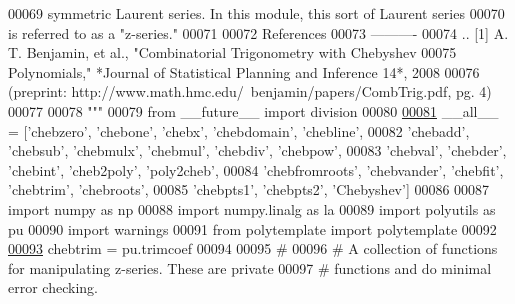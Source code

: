 \begin{DoxyCode}
00069 \textcolor{stringliteral}{symmetric Laurent series.  In this module, this sort of Laurent series}
00070 \textcolor{stringliteral}{is referred to as a "z-series."}
00071 \textcolor{stringliteral}{}
00072 \textcolor{stringliteral}{References}
00073 \textcolor{stringliteral}{----------}
00074 \textcolor{stringliteral}{.. [1] A. T. Benjamin, et al., "Combinatorial Trigonometry with Chebyshev}
00075 \textcolor{stringliteral}{  Polynomials," *Journal of Statistical Planning and Inference 14*, 2008}
00076 \textcolor{stringliteral}{  (preprint: http://www.math.hmc.edu/~benjamin/papers/CombTrig.pdf, pg. 4)}
00077 \textcolor{stringliteral}{}
00078 \textcolor{stringliteral}{"""}
00079 \textcolor{keyword}{from} \_\_future\_\_ \textcolor{keyword}{import} division
00080 
\hypertarget{chebyshev_8py_source_l00081}{}\hyperlink{namespacepyneb_1_1utils_1_1chebyshev_a9cb4e1ba55fc61d6dd46d5c6f534edbc}{00081} \_\_all\_\_ = [\textcolor{stringliteral}{'chebzero'}, \textcolor{stringliteral}{'chebone'}, \textcolor{stringliteral}{'chebx'}, \textcolor{stringliteral}{'chebdomain'}, \textcolor{stringliteral}{'chebline'},
00082         \textcolor{stringliteral}{'chebadd'}, \textcolor{stringliteral}{'chebsub'}, \textcolor{stringliteral}{'chebmulx'}, \textcolor{stringliteral}{'chebmul'}, \textcolor{stringliteral}{'chebdiv'}, \textcolor{stringliteral}{'chebpow'},
00083         \textcolor{stringliteral}{'chebval'}, \textcolor{stringliteral}{'chebder'}, \textcolor{stringliteral}{'chebint'}, \textcolor{stringliteral}{'cheb2poly'}, \textcolor{stringliteral}{'poly2cheb'},
00084         \textcolor{stringliteral}{'chebfromroots'}, \textcolor{stringliteral}{'chebvander'}, \textcolor{stringliteral}{'chebfit'}, \textcolor{stringliteral}{'chebtrim'}, \textcolor{stringliteral}{'chebroots'},
00085         \textcolor{stringliteral}{'chebpts1'}, \textcolor{stringliteral}{'chebpts2'}, \textcolor{stringliteral}{'Chebyshev'}]
00086 
00087 \textcolor{keyword}{import} numpy \textcolor{keyword}{as} np
00088 \textcolor{keyword}{import} numpy.linalg \textcolor{keyword}{as} la
00089 \textcolor{keyword}{import} polyutils \textcolor{keyword}{as} pu
00090 \textcolor{keyword}{import} warnings
00091 \textcolor{keyword}{from} polytemplate \textcolor{keyword}{import} polytemplate
00092 
\hypertarget{chebyshev_8py_source_l00093}{}\hyperlink{namespacepyneb_1_1utils_1_1chebyshev_a66b8c25023851573f25dc418071de82b}{00093} chebtrim = pu.trimcoef
00094 
00095 \textcolor{comment}{#}
00096 \textcolor{comment}{# A collection of functions for manipulating z-series. These are private}
00097 \textcolor{comment}{# functions and do minimal error checking.}

\end{DoxyCode}
